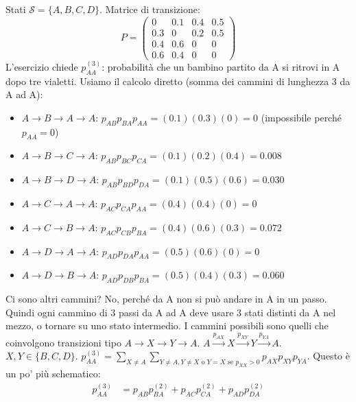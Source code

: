 \begin{exercise}
Stati $\mathcal{S}=\{A,B,C,D\}$. Matrice di transizione:
\begin{equation*}
P = \begin{pmatrix} %
0   & 0.1 & 0.4 & 0.5 \\ %
0.3 & 0   & 0.2 & 0.5 \\ %
0.4 & 0.6 & 0   & 0   \\ %
0.6 & 0.4 & 0   & 0     %
\end{pmatrix}
\end{equation*}
L'esercizio chiede $p_{AA}^{(3)}$: probabilità che un bambino partito da A si ritrovi in A dopo tre vialetti.
Usiamo il calcolo diretto (somma dei cammini di lunghezza 3 da A ad A):
\begin{itemize}
    \item $A \to B \to A \to A$: $p_{AB}p_{BA}p_{AA} = (0.1)(0.3)(0) = 0$ (impossibile perché $p_{AA}=0$)
    \item $A \to B \to C \to A$: $p_{AB}p_{BC}p_{CA} = (0.1)(0.2)(0.4) = 0.008$
    \item $A \to B \to D \to A$: $p_{AB}p_{BD}p_{DA} = (0.1)(0.5)(0.6) = 0.030$
    \item $A \to C \to A \to A$: $p_{AC}p_{CA}p_{AA} = (0.4)(0.4)(0) = 0$
    \item $A \to C \to B \to A$: $p_{AC}p_{CB}p_{BA} = (0.4)(0.6)(0.3) = 0.072$
    \item $A \to D \to A \to A$: $p_{AD}p_{DA}p_{AA} = (0.5)(0.6)(0) = 0$
    \item $A \to D \to B \to A$: $p_{AD}p_{DB}p_{BA} = (0.5)(0.4)(0.3) = 0.060$
\end{itemize}
Ci sono altri cammini? No, perché da A non si può andare in A in un passo. Quindi ogni cammino di 3 passi da A ad A deve usare 3 stati distinti da A nel mezzo, o tornare su uno stato intermedio.
I cammini possibili sono quelli che coinvolgono transizioni tipo $A \to X \to Y \to A$.
$A \xrightarrow{p_{AX}} X \xrightarrow{p_{XY}} Y \xrightarrow{p_{YA}} A$.
$X, Y \in \{B,C,D\}$.
$p_{AA}^{(3)} = \sum_{X \neq A} \sum_{Y \neq A, Y \neq X \text{ o } Y=X \text{ se } p_{XX}>0} p_{AX} p_{XY} p_{YA}$.
Questo è un po' più schematico:
\begin{align*}
p_{AA}^{(3)} &= p_{AB}p_{BA}^{(2)} + p_{AC}p_{CA}^{(2)} + p_{AD}p_{DA}^{(2)} \\

\end{align*}
\end{exercise}
